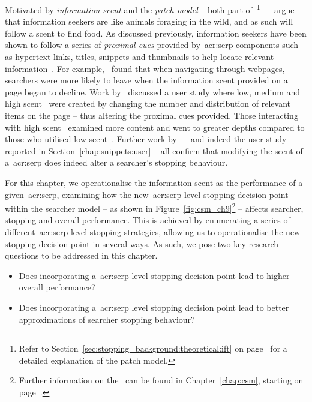 Motivated by \emph{information scent} and the \emph{patch model} -- both part of~\footnote{Refer to Section~\ref{sec:stopping_background:theoretical:ift} on page~\pageref{sec:stopping_background:theoretical:ift} for a detailed explanation of the patch model.} --~\cite{pirolli1999ift} argue that information seekers are like animals foraging in the wild, and as such will follow a scent to find food. As discussed previously, information seekers have been shown to follow a series of \emph{proximal cues} provided by~\gls{acr:serp} components such as hypertext links, titles, snippets and thumbnails to help locate relevant information~\citep{pirolli1995ift, pirolli1999ift, chi2001information_scent, oltston2003scenttrails, pirolli2007ift}. For example,~\cite{card2001scent_graphs} found that when navigating through webpages, searchers were more likely to leave when the information scent provided on a page began to decline. Work by~\cite{wu2014information_scent} discussed a user study where low, medium and high scent~ were created by changing the number and distribution of relevant items on the page -- thus altering the proximal cues provided. Those interacting with high scent~ examined more content and went to greater depths compared to those who utilised low scent~. Further work by~\cite{ong2017scent_behaviour} -- and indeed the user study reported in Section~\ref{chap:snippets:user} -- all confirm that modifying the scent of a~\gls{acr:serp} does indeed alter a searcher's stopping behaviour.

For this chapter, we operationalise the information scent as the performance of a given~\gls{acr:serp}, examining how the new~\gls{acr:serp} level stopping decision point within the searcher model -- as shown in Figure~\ref{fig:csm_ch9}\footnote{Further information on the~ can be found in Chapter~\ref{chap:csm}, starting on page~\pageref{chap:csm}.} -- affects searcher, stopping and overall performance. This is achieved by enumerating a series of different~\gls{acr:serp} level stopping strategies, allowing us to operationalise the new stopping decision point in several ways. As such, we pose two key research questions to be addressed in this chapter.

\begin{itemize}
    \item[]{ Does incorporating a~\gls{acr:serp} level stopping decision point lead to higher overall performance?}
    \item[]{ Does incorporating a~\gls{acr:serp} level stopping decision point lead to better approximations of searcher stopping behaviour?}
\end{itemize}

